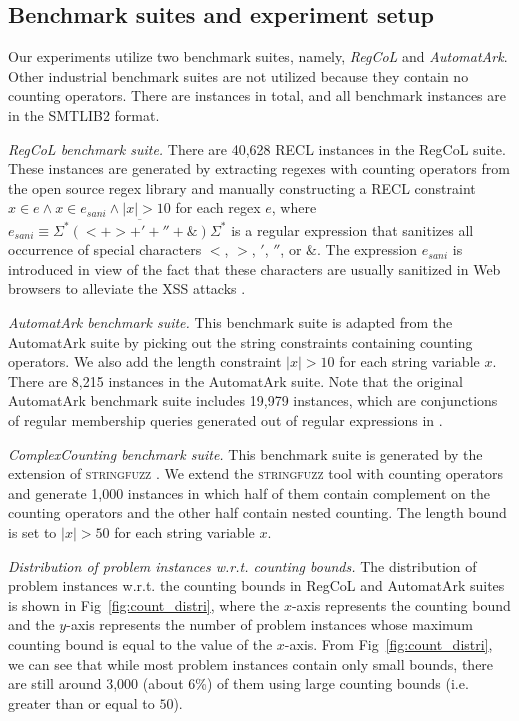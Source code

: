 \subsection{Benchmark suites and experiment setup}\label{sec:bench}

Our experiments utilize two benchmark suites, namely, \emph{RegCoL} and \emph{AutomatArk}. Other industrial benchmark suites are not utilized because they contain no counting operators. There are  instances in total, and all benchmark instances are in the SMTLIB2 format.

\medskip
\noindent
\emph{RegCoL benchmark suite.} There are 40,628 RECL instances in the RegCoL suite. These instances are generated by extracting regexes with counting operators from the open source regex library \cite{regex_lingua_franca,redos_lenka} and manually constructing a RECL constraint $x \in e \wedge x \in e_{sani} \wedge |x| > 10$ for each regex $e$,
where $e_{sani} \equiv \overline{\Sigma^*(<+ >+'+''+\&)\Sigma^*}$ is a regular expression that sanitizes all occurrence of special characters $<$, $>$, $'$, $''$, or $\&$. 
The expression $e_{sani}$ is introduced in view of the fact that these characters are usually sanitized in Web browsers to alleviate the XSS attacks \cite{malware_detection_3_kudzu,CCH_18}.

\medskip
\noindent
\emph{AutomatArk benchmark suite.}
This benchmark suite is adapted from the AutomatArk suite \cite{z3str3re} by picking out the string constraints containing counting operators. We also add the length constraint $|x| > 10$ for each string variable $x$. There are 8,215 instances in the AutomatArk suite.
Note that the original AutomatArk benchmark suite \cite{z3str3re} includes 19,979 instances, which are conjunctions of regular membership queries generated out of regular expressions in \cite{automatark}.

\medskip
\noindent
\emph{ComplexCounting benchmark suite.} This benchmark suite is generated by the extension of \textsc{stringfuzz} \cite{stringfuzz}. We extend the \textsc{stringfuzz} tool with counting operators and generate 1,000 instances in which half of them contain complement on the counting operators and the other half contain nested counting. The length bound is set to $|x| > 50$ for each string variable $x$.

\medskip
\noindent
\emph{Distribution of problem instances w.r.t. counting bounds. }
The distribution of problem instances w.r.t. the counting bounds in RegCoL and AutomatArk suites is shown in Fig~\ref{fig:count_distri}, where the $x$-axis represents the counting bound and the $y$-axis represents the number of problem instances whose maximum counting bound is equal to the value of the $x$-axis. 
From Fig~\ref{fig:count_distri}, we can see that while most problem instances contain only small bounds, there are still around 3,000  (about 6\%) of them using large counting bounds (i.e. greater than or equal to $50$).

